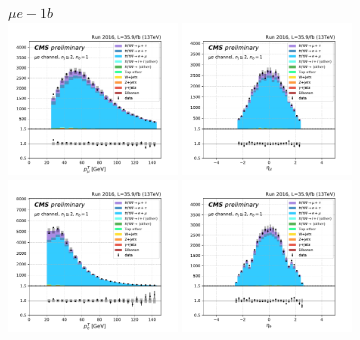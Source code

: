 

\begin{figure}[ht]
    \centering
    $ \mu  e - 1b$ \\
    \includegraphics[width=0.4\textwidth]{chapters/Analysis/sectionPlots/figures/kinematics_pickles/emu/1b/emu_1b_lepton1_pt.pdf}
    \includegraphics[width=0.4\textwidth]{chapters/Analysis/sectionPlots/figures/kinematics_pickles/emu/1b/emu_1b_lepton1_eta.pdf}
    \includegraphics[width=0.4\textwidth]{chapters/Analysis/sectionPlots/figures/kinematics_pickles/emu/1b/emu_1b_lepton2_pt.pdf}
    \includegraphics[width=0.4\textwidth]{chapters/Analysis/sectionPlots/figures/kinematics_pickles/emu/1b/emu_1b_lepton2_eta.pdf}

\end{figure}
